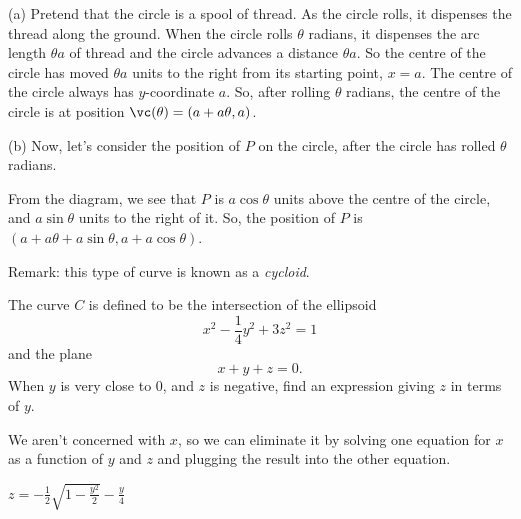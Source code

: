 \begin{solution} (a)
Pretend that the circle is a spool of thread. As the 
           circle rolls, it dispenses the thread along the ground.
           When the circle rolls $\theta$ radians, it dispenses the
           arc length $\theta a$ of thread and the circle advances
           a distance $\theta a$. So the centre of the circle has 
           moved $\theta a$ units to the right from its starting point, $x=a$. The centre of the circle always has $y$-coordinate $a$. So, after rolling $\theta$ radians, the centre of the circle is at position $\vc(\theta)=(a+a\theta,a)$.

(b) 
Now, let's consider the position of $P$ on the circle, after the circle has rolled $\theta$ radians. 

\begin{center}
\end{center}
From the diagram, we see that $P$ is $a\cos \theta$ units above the centre of the circle, and $a\sin \theta$ units to the right of it. So, the position of $P$ is $(a+a\theta+a\sin\theta,a+a\cos\theta)$.

Remark: this type of curve is known as a \emph{cycloid}.
\end{solution}
\begin{question}\label{prob_s1.0last}
The curve $C$ is defined to be the intersection of the ellipsoid
\[x^2-\frac{1}{4}y^2+3z^2=1\]
and the plane
\[x+y+z=0.\]
When $y$ is very close to 0, and $z$ is negative, find an expression giving $z$ in terms of $y$.
\end{question}
\begin{hint}
We aren't concerned with $x$, so we can eliminate it by solving one equation for $x$ as a function
        of $y$ and $z$ and plugging the result into the other equation.
        \end{hint}
\begin{answer}
$z=-\frac12\sqrt{1-\frac{y^2}{2}}-\frac{y}{4}$
\end{answer}
